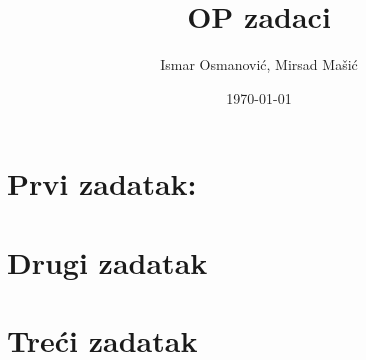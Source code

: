 \documentclass[a4paper, 12pt]{article}
\title{\huge OP zadaci}
\author{Ismar Osmanović, Mirsad Mašić}
\date{\today}
\begin{document}
\maketitle

\section {Prvi zadatak:}


\pagebreak

\section {Drugi zadatak}



\section {Treći zadatak}


\end{document}

